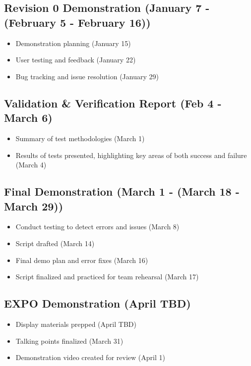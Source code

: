 \documentclass{article}
\begin{document}
	\subsection{Revision 0 Demonstration (January 7 - (February 5 - February 16))}
	\begin{itemize}
		\item Demonstration planning (January 15)
		\item User testing and feedback (January 22)
		\item Bug tracking and issue resolution (January 29)
	\end{itemize}

	\subsection{Validation \& Verification Report (Feb 4 - March 6)}
	\begin{itemize}
		\item Summary of test methodologies (March 1)
		\item Results of tests presented, highlighting key areas of both success and failure (March 4)
	\end{itemize}

	\subsection{Final Demonstration (March 1 - (March 18 - March 29))}
	\begin{itemize}
		\item Conduct testing to detect errors and issues (March 8)
		\item Script drafted (March 14)
		\item Final demo plan and error fixes (March 16)
		\item Script finalized and practiced for team rehearsal (March 17)
	\end{itemize}

	\subsection{EXPO Demonstration (April TBD)}
	\begin{itemize}
		\item Display materials prepped (April TBD)
		\item Talking points finalized (March 31)
		\item Demonstration video created for review (April 1)
	\end{itemize}
\end{document}

